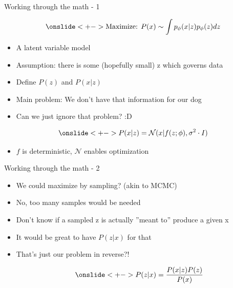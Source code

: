 \documentclass[10pt,aspectratio=169,handout]{beamer}
\begin{document}
\begin{frame}{Working through the math - 1}

    \begin{align*}
        \onslide<+->{\text{Maximize: }P(x) \sim \int p_\phi(x|z)p_\phi(z)dz}
    \end{align*}
    \begin{itemize}[<+->]
        \item A latent variable model
        \item Assumption: there is some (hopefully small) z which governs data
        \item Define $P(z)$ and $P(x|z)$
        \item Main problem: We don't have that information for our dog
        \item Can we just ignore that problem? :D
    \end{itemize}
    \begin{align*}
        \onslide<+->{P(x|z) = \mathcal{N}(x|f(z;\phi),\sigma^2 \cdot I)}
    \end{align*}

    \begin{itemize}[<+->]
        \item $f$ is deterministic, $\mathcal{N}$ enables optimization
    \end{itemize}
\end{frame}

\begin{frame}{Working through the math - 2}
    \begin{itemize}[<+->]
        \item We could maximize by sampling? (akin to MCMC)
        \item No, too many samples would be needed
        \item Don't know if a sampled z is actually ''meant to'' produce a given x
        \item It would be great to have $P(z|x)$ for that
        \item That's just our problem in reverse?!

        \begin{align*}
            \onslide<+->{P(z|x) = \frac{P(x|z)P(z)}{P(x)}}
        \end{align*}

    \end{itemize}
    \end{frame}
\end{document}
